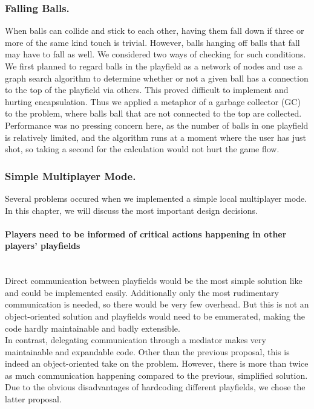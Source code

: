 \subsubsection{Falling Balls.}
\label{sec:garbage}
When balls can collide and stick to each other, having them fall down 
if three or more of the same kind touch is trivial. However, balls 
hanging off balls that fall may have to fall as well. We considered 
two ways of checking for such conditions. We first planned to regard balls in the 
playfield as a network of nodes and use a graph search algorithm to determine 
whether or not a given ball has a connection to the top of the playfield via 
others. This proved difficult to implement and hurting encapsulation. Thus 
we applied a metaphor of a garbage collector (GC) to the problem, where balls
ball that are not connected to the top are collected. Performance was no pressing 
concern here, as the number of balls in one playfield is relatively limited, 
and the algorithm runs at a moment where the user has just shot, so taking a second 
for the calculation would not hurt the game flow.

\subsubsection{Simple Multiplayer Mode.}
\label{sec:playfield}
Several problems occured when we implemented a simple local multiplayer mode. In this chapter,  
we will discuss the most important design decisions.
%
  \paragraph{Players need to be informed of critical actions happening in other players' playfields}
  ~\\
    Direct communication between playfields would be the most simple solution like and 
    could be implemented easily. Additionally only the most rudimentary communication is needed,
    so there would be very few overhead. But this is not an object-oriented solution and playfields 
    would need to be enumerated, making the code hardly maintainable and badly extensible.\\
    In contrast, delegating communication through a mediator makes very maintainable and
    expandable code. Other than the previous proposal, this is indeed an object-oriented 
    take on the problem. However, there is more than twice as much communication happening 
    compared to the previous, simplified solution. Due to the obvious disadvantages of 
    hardcoding different playfields, we chose the latter proposal.

